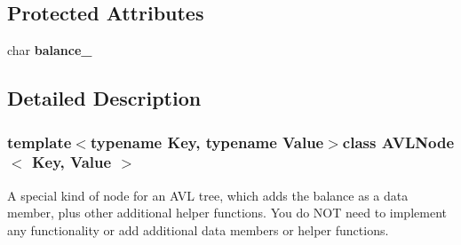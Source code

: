 \subsection*{Protected Attributes}
\begin{DoxyCompactItemize}
\item 
\hypertarget{classAVLNode_afa3bbeb9d7bc41b5fee49c23d5bb298a}{char {\bfseries balance\-\_\-}}\label{classAVLNode_afa3bbeb9d7bc41b5fee49c23d5bb298a}

\end{DoxyCompactItemize}


\subsection{Detailed Description}
\subsubsection*{template$<$typename Key, typename Value$>$class A\-V\-L\-Node$<$ Key, Value $>$}

A special kind of node for an A\-V\-L tree, which adds the balance as a data member, plus other additional helper functions. You do N\-O\-T need to implement any functionality or add additional data members or helper functions. 

